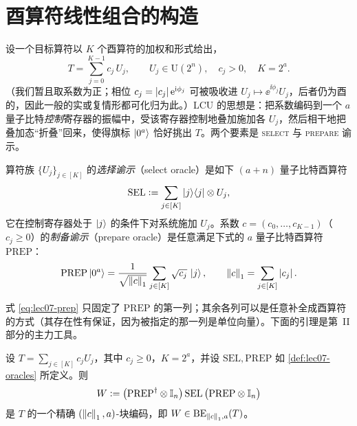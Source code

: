 \section{酉算符线性组合的构造}
\label{sec:lec07-1}

设一个目标算符以 $K$ 个酉算符的加权和形式给出，
\begin{equation}
  T=\sum_{j=0}^{K-1}c_j\,U_j,\qquad U_j\in\mathrm{U}(2^n),\quad c_j>0,\quad K=2^a.
  \label{eq:lec07-Tdef}
\end{equation}
（我们暂且取系数为正；相位 $c_j=\left\lvert c_j \right\rvert\mathrm{e}^{\mathrm{i}\phi_j}$ 可被吸收进 $U_j\mapsto\ee^{\ii\phi_j}U_j$，后者仍为酉的，因此一般的实或复情形都可化归为此。）LCU 的思想是：把系数编码到一个 $a$ 量子比特\emph{控制}寄存器的振幅中，受该寄存器控制地叠加施加各 $U_j$，然后相干地把叠加态“折叠”回来，使得旗标 $\ket{0^a}$ 恰好挑出 $T$。两个要素是 \textsc{select} 与 \textsc{prepare} 谕示。

\begin{definition}
\label{def:lec07-oracles}
算符族 $\{U_j\}_{j\in[K]}$ 的\emph{选择谕示}（select oracle）是如下 $(a+n)$ 量子比特酉算符
\begin{equation}
  \mathrm{SEL}\vcentcolon=\sum_{j\in[K]}\ket{j}\!\bra{j}\otimes U_j,
  \label{eq:lec07-sel}
\end{equation}
它在控制寄存器处于 $\ket{j}$ 的条件下对系统施加 $U_j$。系数 $c=(c_0,\dots,c_{K-1})$（$c_j\ge0$）的\emph{制备谕示}（prepare oracle）是任意满足下式的 $a$ 量子比特酉算符 $\mathrm{PREP}$：
\begin{equation}
  \mathrm{PREP}\ket{0^a}=\frac{1}{\sqrt{\left\lVert c \right\rVert_1}}\sum_{j\in[K]}\sqrt{c_j}\,\ket{j},
  \qquad \left\lVert c \right\rVert_1=\sum_{j\in[K]}\left\lvert c_j \right\rvert.
  \label{eq:lec07-prep}
\end{equation}
\end{definition}

式 \eqref{eq:lec07-prep} 只固定了 $\mathrm{PREP}$ 的第一列；其余各列可以是任意补全成酉算符的方式（其存在性有保证，因为被指定的那一列是单位向量）。下面的引理是第~II 部分的主力工具。

\begin{theorem}[酉算符线性组合]
\label{thm:lec07-lcu}
设 $T=\sum_{j\in[K]}c_j U_j$，其中 $c_j\ge0$，$K=2^a$，并设 $\mathrm{SEL},\mathrm{PREP}$ 如 \cref{def:lec07-oracles} 所定义。则
\begin{equation}
  W\vcentcolon=\bigl(\mathrm{PREP}^{\dagger}\otimes\mathbb{I}_n\bigr)\,\mathrm{SEL}\,
          \bigl(\mathrm{PREP}\otimes\mathbb{I}_n\bigr)
  \label{eq:lec07-W}
\end{equation}
是 $T$ 的一个精确 $(\left\lVert c \right\rVert_1,a)$-块编码，即
$W\in\mathrm{BE}_{\left\lVert c \right\rVert_1,a}(T)$。
\end{theorem}

